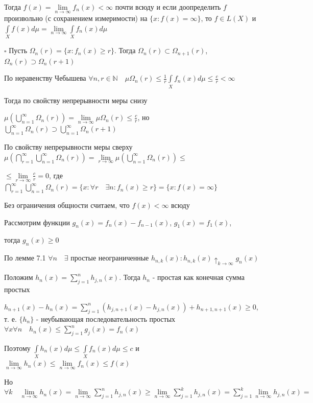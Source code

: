 \documentclass[a4paper]{report}
\begin{document}
Тогда $f(x)=\lim\limits_{n\to\infty}f_n(x)<\infty$ почти всюду и если доопределить $f$ произвольно (с сохранением измеримости) на $\{x\colon f(x)=\infty\}$, то $f\in L(X)$ и $\displaystyle\int\limits_X f(x)d\mu=\lim\limits_{n\to\infty}\displaystyle\int\limits_X f_n(x)d\mu$

\noindent $\square$ Пусть $\Omega_n(r)=\{x\colon f_n(x)\ge r\}$. Тогда $\Omega_n(r)\subset\Omega_{n+1}(r)$, $\Omega_n(r)\supset\Omega_n(r+1)$

По неравенству Чебышева $\forall n,r\in\mathbb N\quad \mu\Omega_n(r)\le\displaystyle\frac1r\displaystyle\int\limits_X f_n(x)d\mu\le\frac{c}{r}<\infty$

Тогда по свойству непрерывности меры снизу

$\mu\left(\bigcup\limits_{n=1}^\infty\Omega_n(r)\right)=\lim\limits_{n\to\infty}\mu\Omega_n(r)\le\frac{c}{r}$, но $\bigcup\limits_{n=1}^\infty\Omega_n(r)\supset\bigcup\limits_{n=1}^\infty\Omega_n(r+1)$

По свойству непрерывности меры сверху $\mu\left(\bigcap\limits_{r=1}^\infty \bigcup\limits_{n=1}^\infty \Omega_n(r)\right)=\lim\limits_{r\to\infty}\mu\left(\bigcup\limits_{n=1}^\infty\Omega_n(r)\right)\le$

\noindent $\le\lim\limits_{r\to\infty}\frac{c}{r}=0$, где $\bigcap\limits_{r=1}^\infty\bigcup\limits_{n=1}^\infty \Omega_n(r)=\{x\colon\forall r\quad\exists n\colon f_n(x)\ge r\}=\{x\colon f(x)=\infty\}$

Без ограничения общности считаем, что $f(x)<\infty$ всюду

 Рассмотрим функции $g_n(x)=f_n(x)-f_{n-1}(x)$, $g_1(x)=f_1(x)$,

тогда $g_n(x)\ge0$

По лемме 7.1 $\forall n\quad \exists$ простые неограниченные $h_{n,k}(x)\colon h_{n,k}(x)\uparrow_{k\to\infty}g_n(x)$

Положим $h_n(x)=\sum\limits_{j=1}^n h_{j,n}(x)$. Тогда $h_n$ - простая как конечная сумма простых

$h_{n+1}(x)-h_n(x)=\sum\limits_{j=1}^n\left(h_{j,n+1}(x)-h_{j,n}(x)\right)+h_{n+1,n+1}(x)\ge0$, т. е. $\{h_n\}$ -  неубывающая последовательность простых $\forall x\forall n\quad h_n(x)\le\sum\limits_{j=1}^n g_j(x)=f_n(x)$

Поэтому $\displaystyle\int\limits_X h_n(x)d\mu\le\displaystyle\int\limits_X f_n(x) d\mu\le c$ и $\lim\limits_{n\to\infty} h_n(x)\le\lim\limits_{n\to\infty}f_n(x)\le f(x)$

Но $\forall k\quad\lim\limits_{n\to\infty}h_n(x)=\lim\limits_{n\to\infty}\sum\limits_{j=1}^n h_{j,n}(x)\ge\lim\limits_{n\to\infty}\sum\limits_{j=1}^k h_{j,n}(x)=
\sum\limits_{j=1}^k\lim\limits_{n\to\infty} h_{j,n}(x)=$
\end{document}
